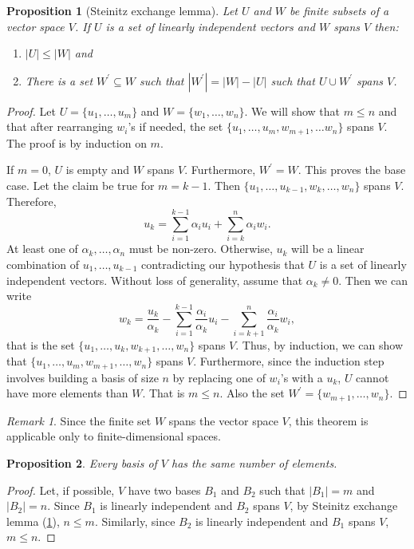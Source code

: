 \documentclass{article}
\theoremstyle{plain}
\numberwithin{thm}{section}
\theoremstyle{plain}
\newtheorem{prop}{Proposition}
\numberwithin{prop}{section}
\theoremstyle{definition}
\numberwithin{defn}{section}
\theoremstyle{remark}
\newtheorem*{rem}{Remark}
\numberwithin{equation}{section}
\begin{document}
\begin{prop}[Steinitz exchange lemma]\label{s1p2}
Let $U$ and $W$ be finite subsets of a vector space $V$. If $U$ is a set of 
linearly independent vectors and $W$ spans $V$ then:
\begin{enumerate}
\item $|U| \le |W|$ and
\item There is a set $W^\prime \subseteq W$ such that $|W^\prime| = |W| - |U|$ 
such that $U \cup W^\prime$ spans $V$.
\end{enumerate}
\end{prop}
\begin{proof}
Let $U = \{u_1, \ldots, u_m\}$ and $W = \{w_1, \ldots, w_n\}$. We will show 
that $m \le n$ and that after rearranging $w_i$'s if needed, the set $\{u_1,
\ldots, u_m, w_{m+1}, \ldots w_n\}$ spans $V$. The proof is by induction on $m$.

If $m = 0$, $U$ is empty and $W$ spans $V$. Furthermore, $W^\prime = W$. This
proves the base case. Let the claim be true for $m = k-1$. Then $\{u_1, \ldots,
u_{k-1}, w_k, \ldots, w_n\}$ spans $V$. Therefore,
\[
u_k = \sum_{i=1}^{k-1}\alpha_iu_i + \sum_{i=k}^n\alpha_iw_i.
\]
At least one of $\alpha_k, \ldots, \alpha_n$ must be non-zero. Otherwise, $u_k$
will be a linear combination of $u_1, \ldots, u_{k-1}$ contradicting our
hypothesis that $U$ is a set of linearly independent vectors. Without loss of
generality, assume that $\alpha_k \ne 0$. Then we can write
\[
w_k = \frac{u_k}{\alpha_k} - \sum_{i=1}^{k-1}\frac{\alpha_i}{\alpha_k}u_i - 
\sum_{i=k+1}^n\frac{\alpha_i}{\alpha_k}w_i,
\]
that is the set $\{u_1, \ldots, u_k, w_{k+1}, \ldots, w_n\}$ spans $V$. Thus,
by induction, we can show that $\{u_1, \ldots, u_m, w_{m+1}, \ldots, w_n\}$ 
spans $V$. Furthermore, since the induction step involves building a basis of
size $n$ by replacing one of $w_i$'s with a $u_k$, $U$ cannot have more elements
than $W$. That is $m \le n$. Also the set $W^\prime = \{w_{m+1}, \ldots, w_n\}$.
\end{proof}
\begin{rem}
Since the finite set $W$ spans the vector space $V$, this theorem is applicable
only to finite-dimensional spaces.
\end{rem}

\begin{prop}\label{s1p3}
Every basis of $V$ has the same number of elements.
\end{prop}
\begin{proof}
Let, if possible, $V$ have two bases $B_1$ and $B_2$ such that $|B_1| = m$ and
$|B_2| = n$. Since $B_1$ is linearly independent and $B_2$ spans $V$, by Steinitz
exchange lemma (\ref{s1p2}), $n \le m$. Similarly, since $B_2$ is linearly
independent and $B_1$ spans $V$, $m \le n$.
\end{proof}
\end{document}
